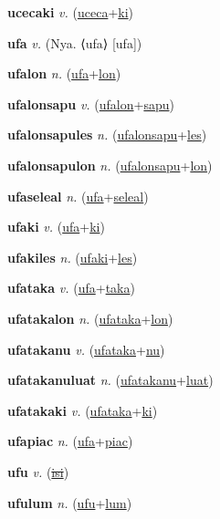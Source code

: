 \textbf{\hypertarget{ucecaki}{ucecaki}} \textit{v.} (\hyperlink{uceca}{uceca}+\allowbreak \hyperlink{ki}{ki})


\textbf{\hypertarget{ufa}{ufa}} \textit{v.} (Nya. ⟨ufa⟩ [ufa])


\textbf{\hypertarget{ufalon}{ufalon}} \textit{n.} (\hyperlink{ufa}{ufa}+\allowbreak \hyperlink{lon}{lon})


\textbf{\hypertarget{ufalonsapu}{ufalonsapu}} \textit{v.} (\hyperlink{ufalon}{ufalon}+\allowbreak \hyperlink{sapu}{sapu})


\textbf{\hypertarget{ufalonsapules}{ufalonsapules}} \textit{n.} (\hyperlink{ufalonsapu}{ufalonsapu}+\allowbreak \hyperlink{les}{les})


\textbf{\hypertarget{ufalonsapulon}{ufalonsapulon}} \textit{n.} (\hyperlink{ufalonsapu}{ufalonsapu}+\allowbreak \hyperlink{lon}{lon})


\textbf{\hypertarget{ufaseleal}{ufaseleal}} \textit{n.} (\hyperlink{ufa}{ufa}+\allowbreak \hyperlink{seleal}{seleal})


\textbf{\hypertarget{ufaki}{ufaki}} \textit{v.} (\hyperlink{ufa}{ufa}+\allowbreak \hyperlink{ki}{ki})


\textbf{\hypertarget{ufakiles}{ufakiles}} \textit{n.} (\hyperlink{ufaki}{ufaki}+\allowbreak \hyperlink{les}{les})


\textbf{\hypertarget{ufataka}{ufataka}} \textit{v.} (\hyperlink{ufa}{ufa}+\allowbreak \hyperlink{taka}{taka})


\textbf{\hypertarget{ufatakalon}{ufatakalon}} \textit{n.} (\hyperlink{ufataka}{ufataka}+\allowbreak \hyperlink{lon}{lon})


\textbf{\hypertarget{ufatakanu}{ufatakanu}} \textit{v.} (\hyperlink{ufataka}{ufataka}+\allowbreak \hyperlink{nu}{nu})


\textbf{\hypertarget{ufatakanuluat}{ufatakanuluat}} \textit{n.} (\hyperlink{ufatakanu}{ufatakanu}+\allowbreak \hyperlink{luat}{luat})


\textbf{\hypertarget{ufatakaki}{ufatakaki}} \textit{v.} (\hyperlink{ufataka}{ufataka}+\allowbreak \hyperlink{ki}{ki})


\textbf{\hypertarget{ufapiac}{ufapiac}} \textit{n.} (\hyperlink{ufa}{ufa}+\allowbreak \hyperlink{piac}{piac})


\textbf{\hypertarget{ufu}{ufu}} \textit{v.} (\hyperlink{isi}{\sout{isi}})


\textbf{\hypertarget{ufulum}{ufulum}} \textit{n.} (\hyperlink{ufu}{ufu}+\allowbreak \hyperlink{lum}{lum})


